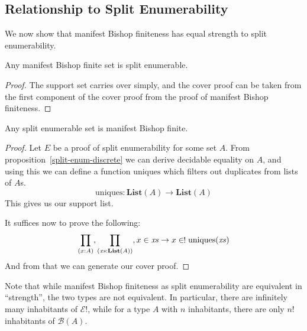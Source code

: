\subsection{Relationship to Split Enumerability}
We now show that manifest Bishop finiteness has equal strength to split
enumerability.
\begin{lemma}
  Any manifest Bishop finite set is split enumerable.
\end{lemma}
\begin{proof}
  The support set carries over simply, and the cover proof can be taken from the
  first component of the cover proof from the proof of manifest Bishop
  finiteness.
\end{proof}
\begin{theorem} \label{split-enum-to-manifest-bishop}
  Any split enumerable set is manifest Bishop finite.
\end{theorem}
\begin{proof}
  Let \(E\) be a proof of split enumerability for some set \(A\).
  From proposition~\ref{split-enum-discrete} we can derive decidable equality on
  \(A\), and using this we can define a function \(\text{uniques}\) which filters
  out duplicates from lists of \(A\)s.
  \begin{equation}
    \text{uniques} : \textbf{List}(A) \rightarrow \textbf{List}(A)
  \end{equation}
  This gives us our support list.

  It suffices now to prove the following:
  \begin{equation}
    \prod_{(x : A)} , \prod_{(\mathit{xs} : \textbf{List}(A))} , x \in \mathit{xs} \rightarrow x \inunique \text{uniques}(\mathit{xs})
  \end{equation}
  And from that we can generate our cover proof.
\end{proof}
Note that while manifest Bishop finiteness as split enumerability are equivalent
in ``strength'', the two types are not equivalent.
In particular, there are infinitely many inhabitants of \(\mathcal{E}!\), while
for a type \(A\) with \(n\) inhabitants, there are only \(n!\) inhabitants of
\(\mathcal{B}(A)\).
